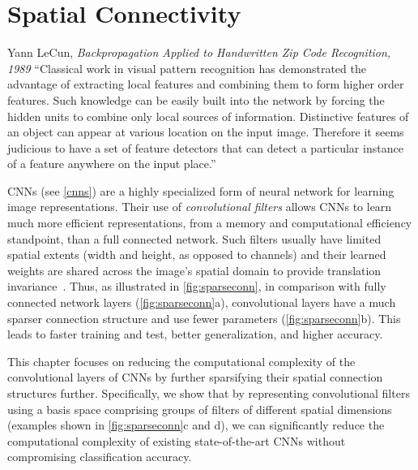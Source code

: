 \documentclass[thesis]{subfiles}
\begin{document}
	\chapter{Spatial Connectivity}\label{lowrankfilters}
	\begin{chapquote}{Yann LeCun, \textit{Backpropagation Applied to Handwritten Zip Code Recognition, 1989}}
        ``Classical work in visual pattern recognition has demonstrated the advantage of extracting local features and combining them to form higher order features. Such knowledge can be easily built into the network by forcing the hidden units to combine only local sources of information. Distinctive features of an object can appear at various location on the input image. Therefore it seems judicious to have a set of feature detectors that can detect a particular instance of a feature anywhere on the input place.''
    \end{chapquote}
    
    CNNs (see \cref{cnns}) are a highly specialized form of neural network for learning image representations. Their use of \emph{convolutional filters} allows CNNs to learn much more efficient representations, from a memory and computational efficiency standpoint, than a full connected network. Such filters usually have limited spatial extents (\ie{}width and height, as opposed to channels) and their learned weights are shared across the image's spatial domain to provide translation invariance~\citep{Fuk80,Lecun1998}.
    Thus, as illustrated in \cref{fig:sparseconn}, in comparison with fully connected network layers (\cref{fig:sparseconn}a), convolutional layers have a much sparser connection structure and use fewer parameters (\cref{fig:sparseconn}b).
    This leads to faster training and test, better generalization, and higher accuracy.
    
    This chapter focuses on reducing the computational complexity of the convolutional layers of CNNs by further sparsifying their spatial connection structures further.  Specifically, we show that by representing convolutional filters using a basis space comprising groups of filters of different spatial dimensions (examples shown in \cref{fig:sparseconn}c and d), we can significantly reduce the computational complexity of existing state-of-the-art CNNs without compromising classification accuracy.
    
\end{document}
